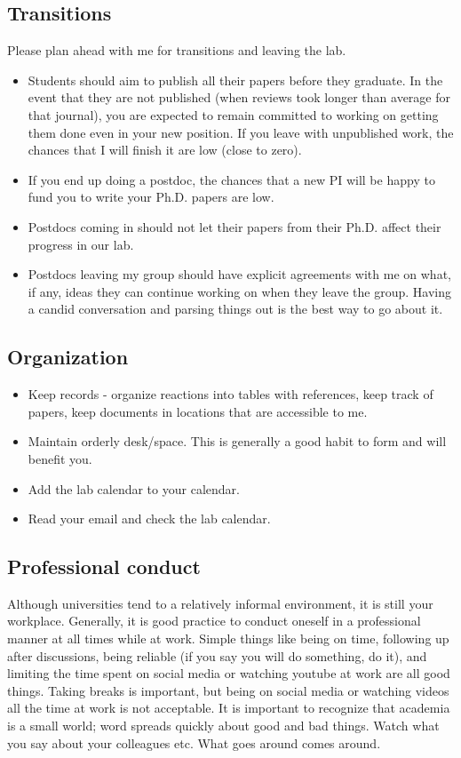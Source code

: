 \documentclass[12pt]{article}
\begin{document}
\subsection{Transitions}

Please plan ahead with me for transitions and leaving the lab.

\begin{itemize}
  \item Students should aim to publish all their papers before they graduate.
        In the event that they are not published (when reviews took longer than average for that journal), you are expected to remain committed to working on getting them done even in your new position.
        If you leave with unpublished work, the chances that I will finish it are low (close to zero).
  \item If you end up doing a postdoc, the chances that a new PI will be happy to fund you to write your Ph.D. papers are low.
  \item Postdocs coming in should not let their papers from their Ph.D. affect their progress in our lab.
  \item Postdocs leaving my group should have explicit agreements with me on what, if any, ideas they can continue working on when they leave the group.
        Having a candid conversation and parsing things out is the best way to go about it.
\end{itemize}

\subsection{Organization}

\begin{itemize}
  \item Keep records - organize reactions into tables with references, keep track of papers, keep documents in locations that are accessible to me.
  \item Maintain orderly desk/space.
        This is generally a good habit to form and will benefit you.
  \item Add the lab calendar to your calendar.
  \item Read your email and check the lab calendar.
\end{itemize}

\subsection{Professional conduct}
Although universities tend to a relatively informal environment, it is still your workplace.
Generally, it is good practice to conduct oneself in a professional manner at all times while at work.
Simple things like being on time, following up after discussions, being reliable (if you say you will do something, do it), and limiting the time spent on social media or watching youtube at work are all good things.
Taking breaks is important, but being on social media or watching videos all the time at work is not acceptable.
It is important to recognize that academia is a small world; word spreads quickly about good and bad things.
Watch what you say about your colleagues etc. What goes around comes around.
\end{document}
